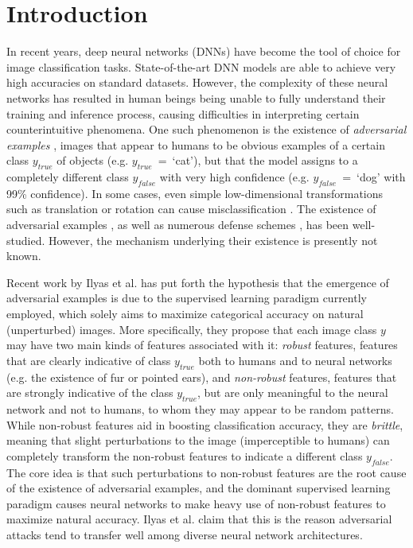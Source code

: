 \section{Introduction}\label{sec:intro}

In recent years, deep neural networks (DNNs) have become the tool of choice for image classification tasks. State-of-the-art DNN models are able to achieve very high accuracies on standard datasets. However, the complexity of these neural networks has resulted in human beings being unable to fully understand their training and inference process, causing difficulties in interpreting certain counterintuitive phenomena. One such phenomenon is the existence of \textit{adversarial examples} \cite{Biggio2013, Szegedy13}, images that appear to humans to be obvious examples of a certain class $y_{true}$ of objects (e.g. $y_{true}$~=~`cat'), but that the model assigns to a completely different class $y_{false}$ with very high confidence (e.g. $y_{false}$~=~`dog' with 99\% confidence). In some cases, even simple low-dimensional transformations such as translation or rotation can cause misclassification \cite{Engstrom17}. The existence of adversarial examples \cite{Goodfellow14,Madry18,Engstrom17}, as well as numerous defense schemes \cite{Zhang19, Wong18, Ragunathan18, Engstrom18, Kannan18}, has been well-studied. However, the mechanism underlying their existence is presently not known. 

Recent work by Ilyas et al. \cite{Ilyas2019} has put forth the hypothesis that the emergence of adversarial examples is due to the supervised learning paradigm currently employed, which solely aims to maximize categorical accuracy on natural (unperturbed) images. More specifically, they propose that each image class $y$ may have two main kinds of features associated with it: \textit{robust} features, features that are clearly indicative of class $y_{true}$ both to humans and to neural networks (e.g. the existence of fur or pointed ears), and \textit{non-robust} features, features that are strongly indicative of the class $y_{true}$, but are only meaningful to the neural network and not to humans, to whom they may appear to be random patterns. While non-robust features aid in boosting classification accuracy, they are \textit{brittle}, meaning that slight perturbations to the image (imperceptible to humans) can completely transform the non-robust features to indicate a different class $y_{false}$. The core idea is that such perturbations to non-robust features are the root cause of the existence of adversarial examples, and the dominant supervised learning paradigm causes neural networks to make heavy use of non-robust features to maximize natural accuracy. Ilyas et al. claim that this is the reason adversarial attacks tend to transfer well among diverse neural network architectures.

